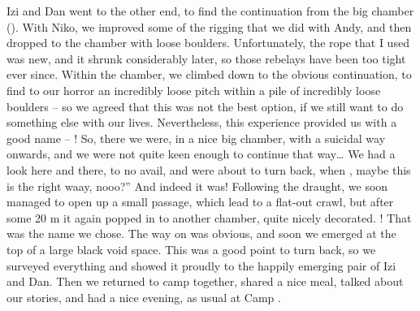 Izi and Dan went to the other end, to find the continuation from the big
chamber (). With Niko, we improved some of the rigging
that we did with Andy, and then dropped to the chamber with loose
boulders. Unfortunately, the rope that I used was new, and it shrunk
considerably later, so those rebelays have been too tight ever since.
Within the chamber, we climbed down to the obvious continuation, to find
to our horror an incredibly loose pitch within a pile of incredibly
loose boulders -- so we agreed that this was not the best option, if we
still want to do something else with our lives. Nevertheless, this
experience provided us with a good name -- ! So,
there we were, in a nice big chamber, with a suicidal way onwards, and
we were not quite keen enough to continue that way\ldots{} We had a look
here and there, to no avail, and were about to turn back, when , maybe this is the right waay, nooo?'' And indeed it was!
Following the draught, we soon managed to open up a small passage, which
lead to a flat-out crawl, but after some 20 m it again popped in to
another chamber, quite nicely decorated. ! That
was the name we chose. The way on was obvious, and soon we emerged at
the top of a large black void space. This was a good point to turn back,
so we surveyed everything and showed it proudly to the happily emerging
pair of Izi and Dan. Then we returned to camp together, shared a nice
meal, talked about our stories, and had a nice evening, as usual at Camp
.




